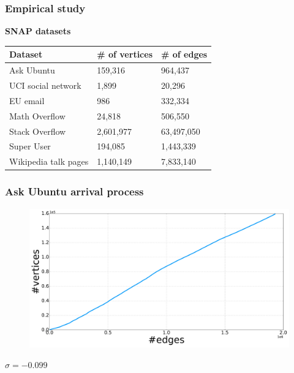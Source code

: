 \documentclass[final,hyperref={pdfpagelabels=false},noamsthm]{beamer}
\begin{document}
\begin{frame}
	\frametitle{Empirical study}
	\textbf{SNAP datasets} \cite{snapnets}
	\begin{table}[b]
		\label{tab:datasets}
		\begin{center}
			\begin{tabular}{lll}
				Dataset                 & \# of vertices   & \# of edges    \\
				\hline
				Ask Ubuntu    & 159,316   & 964,437    \\
				UCI social network   & 1,899     & 20,296     \\
				EU email        & 986       & 332,334    \\
				Math Overflow & 24,818    & 506,550    \\
				Stack Overflow           & 2,601,977 & 63,497,050 \\
				Super User    & 194,085   & 1,443,339  \\
				Wikipedia talk pages    & 1,140,149 & 7,833,140 \\
			\end{tabular}
		\end{center}
	\end{table}
	
\end{frame}

\begin{frame}
	\frametitle{Ask Ubuntu arrival process}
	\begin{figure}[h]
		\includegraphics[width=1.0\textwidth]{fig/n_askubuntu_arrival.pdf}
	\end{figure}
	$\hat{\sigma} = -0.099$
\end{frame}
\end{document}
